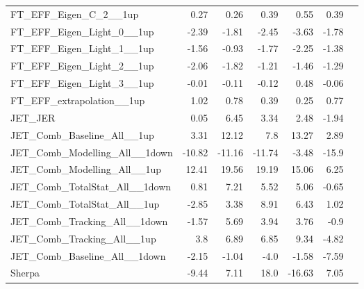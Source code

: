 \begin{table}[htbp]
{\begin{tabular}{lrrrrrr}
FT\_EFF\_Eigen\_C\_2\_\_1up        & 0.27               & 0.26                 & 0.39                 & 0.55                 & 0.39                 \\
FT\_EFF\_Eigen\_Light\_0\_\_1up    & -2.39              & -1.81                & -2.45                & -3.63                & -1.78                \\
FT\_EFF\_Eigen\_Light\_1\_\_1up    & -1.56              & -0.93                & -1.77                & -2.25                & -1.38                \\
FT\_EFF\_Eigen\_Light\_2\_\_1up    & -2.06              & -1.82                & -1.21                & -1.46                & -1.29                \\
FT\_EFF\_Eigen\_Light\_3\_\_1up    & -0.01              & -0.11                & -0.12                & 0.48                 & -0.06                \\
FT\_EFF\_extrapolation\_\_1up      & 1.02               & 0.78                 & 0.39                 & 0.25                 & 0.77                 \\
JET\_JER                           & 0.05               & 6.45                 & 3.34                 & 2.48                 & -1.94                \\
JET\_Comb\_Baseline\_All\_\_1up    & 3.31               & 12.12                & 7.8                  & 13.27                & 2.89                 \\
JET\_Comb\_Modelling\_All\_\_1down & -10.82             & -11.16               & -11.74               & -3.48                & -15.9                \\
JET\_Comb\_Modelling\_All\_\_1up   & 12.41              & 19.56                & 19.19                & 15.06                & 6.25                 \\
JET\_Comb\_TotalStat\_All\_\_1down & 0.81               & 7.21                 & 5.52                 & 5.06                 & -0.65                \\
JET\_Comb\_TotalStat\_All\_\_1up   & -2.85              & 3.38                 & 8.91                 & 6.43                 & 1.02                 \\
JET\_Comb\_Tracking\_All\_\_1down  & -1.57              & 5.69                 & 3.94                 & 3.76                 & -0.9                 \\
JET\_Comb\_Tracking\_All\_\_1up    & 3.8                & 6.89                 & 6.85                 & 9.34                 & -4.82                \\
JET\_Comb\_Baseline\_All\_\_1down  & -2.15              & -1.04                & -4.0                 & -1.58                & -7.59                \\
Sherpa                             & -9.44              & 7.11                 & 18.0                 & -16.63               & 7.05                 \\
\end{tabular}}
\end{table}



